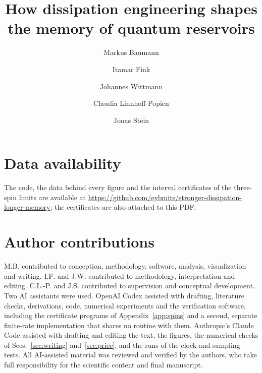 \documentclass[a4paper,twocolumn,11pt,unpublished]{quantumarticle}
\theoremstyle{keyresult}
\begin{document}


\title{How dissipation engineering shapes the memory of quantum reservoirs}

\author[qar,mobile]{Markus Baumann}
\author[mobile]{Itamar Fink}
\author[mobile]{Johannes Wittmann}
\author[qar,mobile]{Claudia Linnhoff-Popien}
\author[qar,mobile]{Jonas Stein}


\maketitle
\raggedbottom
\makeatletter{}\makeatother







\section*{Data availability}
The code, the data behind every figure and the interval certificates of the three-spin limits are available at
\url{https://github.com/eybmits/stronger-dissipation-longer-memory}; the certificates are also attached to this PDF.

\section*{Author contributions}
M.B. contributed to conception, methodology, software, analysis, visualization and writing. I.F. and J.W.
contributed to methodology, interpretation and editing. C.L.-P. and J.S. contributed to supervision and
conceptual development. Two AI assistants were used. OpenAI Codex assisted with drafting, literature checks,
derivations, code, numerical experiments and the verification software, including the certificate programs of
Appendix~\ref{app:spins} and a second, separate finite-rate implementation that shares no routine with them.
Anthropic's Claude Code assisted with drafting and editing the text, the figures, the numerical checks of
Secs.~\ref{sec:writing} and~\ref{sec:price}, and the runs of the clock and sampling tests. All AI-assisted
material was reviewed and verified by the authors, who take full responsibility for the scientific content and
final manuscript.
\end{document}
